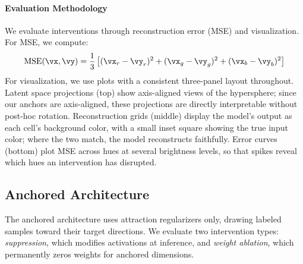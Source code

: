 \paragraph{Evaluation Methodology}
We evaluate interventions through reconstruction error (MSE) and visualization. For MSE, we compute:
\begin{equation}
    \text{MSE}(\vx,\vy) = \frac{1}{3}\left[(\vx_r - \vy_r)^2 + (\vx_g - \vy_g)^2 + (\vx_b - \vy_b)^2\right] \label{eq:mse_per_color}
\end{equation}
For visualization, we use plots with a consistent three-panel layout throughout. Latent space projections (top) show axis-aligned views of the hypersphere; since our anchors are axis-aligned, these projections are directly interpretable without post-hoc rotation. Reconstruction grids (middle) display the model's output as each cell's background color, with a small inset square showing the true input color; where the two match, the model reconstructs faithfully. Error curves (bottom) plot MSE across hues at several brightness levels, so that spikes reveal which hues an intervention has disrupted.

\begin{table}[htb]
    \centering
    \footnotesize
    \captionsetup{width=\linewidth-20pt}
    \caption{\textbf{Interventions selectively target .} Reconstruction error (MSE) for two architectures: Anchored (\cref{sec:anchored_architecture}) uses attraction only; Isolated (\cref{sec:isolated_architecture}) adds repulsion to enable selective weight ablation. Both suppression and ablation increase error for  while preserving orthogonal colors.}
    
    \label{tab:intervention-results}
\end{table}


%

\subsection{Anchored Architecture}
\label{sec:anchored_architecture}

The anchored architecture uses attraction regularizers only, drawing labeled samples toward their target directions. We evaluate two intervention types: \textit{suppression}, which modifies activations at inference, and \textit{weight ablation}, which permanently zeros weights for anchored dimensions.

